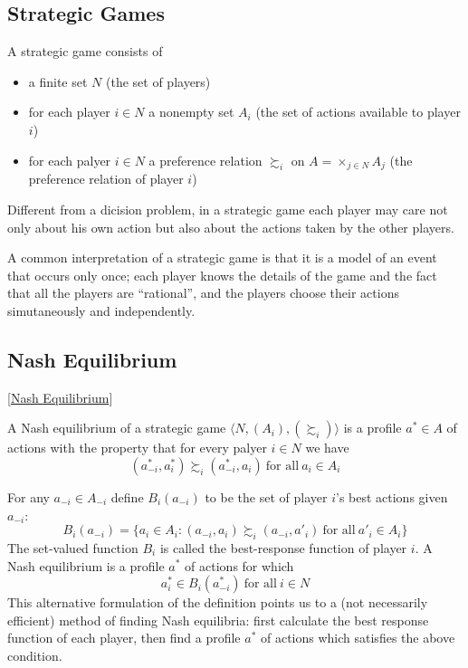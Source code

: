 \subsection{Strategic Games}

A strategic game consists of
\begin{itemize}
	\item a finite set $N$ (the set of players)
	\item for each player $i\in N$ a nonempty set $A_i$ (the set of actions
		available to player $i$)
	\item for each palyer $i\in N$ a preference relation $\succsim_i$ on
		$A = \times_{j\in N} A_j$ (the preference relation of player $i$)
\end{itemize}
Different from a dicision problem, in a strategic game each player may care
not only about his own action but also about the actions taken by the other
players. 

A common interpretation of a strategic game is that it is a model of an event
that occurs only once; each player knows the details of the game and the
fact that all the players are ``rational'', and the players choose their
actions simutaneously and independently.

\subsection{Nash Equilibrium}

[\href{https://en.wikipedia.org/wiki/Nash_equilibrium}{Nash Equilibrium}]

A Nash equilibrium of a strategic game $\langle N, (A_i), (\succsim_i)\rangle$
is a profile $a^* \in A$ of actions with the property that for every palyer
$i\in N$ we have
$$(a^*_{-i},a^*_i) \succsim_i (a^*_{-i},a_i) ~\text{for all}~ a_i \in A_i$$

For any $a_{-i} \in A_{-i}$ define $B_i(a_{-i})$ to be the set of player $i$'s
best actions given $a_{-i}$:
$$ B_i(a_{-i}) = \{ a_i\in A_i:
	(a_{-i},a_i) \succsim_i (a_{-i},a'_i) ~\text{for all}~ a'_i \in A_i\} $$
The set-valued function $B_i$ is called the best-response function of player
$i$. A Nash equilibrium is a profile $a^*$ of actions for which
$$ a^*_i \in B_i(a_{-i}^*) ~\text{for all}~ i \in N $$
This alternative formulation of the definition points us to a (not necessarily
efficient) method of finding Nash equilibria: first calculate the best response
function of each player, then find a profile $a^*$ of actions which satisfies
the above condition.

